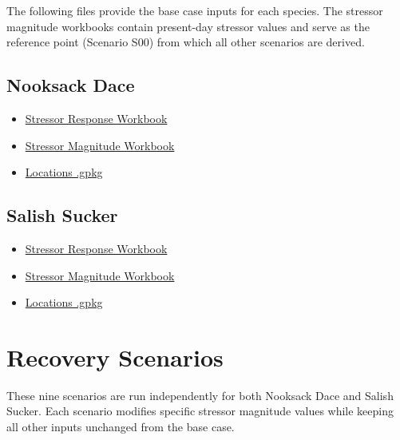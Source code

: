 \documentclass[
  letterpaper,
  DIV=11,
  numbers=noendperiod]{scrreprt}
\providecommand{\tightlist}{%
  \setlength{\itemsep}{0pt}\setlength{\parskip}{0pt}}
\begin{document}
The following files provide the base case inputs for each species. The
stressor magnitude workbooks contain present-day stressor values and
serve as the reference point (Scenario S00) from which all other
scenarios are derived.

\subsection*{Nooksack Dace}\label{nooksack-dace}

\begin{itemize}
\tightlist
\item
  \href{./sample_data/ndss_nooksack_dace/Stressor\%20Response\%20-\%20Nooksack\%20Dace.xlsx}{Stressor
  Response Workbook}
\item
  \href{./sample_data/ndss_nooksack_dace/Stressor\%20Magnitude\%20_\%20Nooksack\%20Dace.xlsx}{Stressor
  Magnitude Workbook}
\item
  \href{./sample_data/ndss_nooksack_dace/Locations_Nooksack_Dace.gpkg}{Locations
  .gpkg}
\end{itemize}

\subsection*{Salish Sucker}\label{salish-sucker}

\begin{itemize}
\tightlist
\item
  \href{./sample_data/ndss_salish_sucker/Stressor\%20Response\%20-\%20Salish\%20Sucker.xlsx}{Stressor
  Response Workbook}
\item
  \href{./sample_data/ndss_salish_sucker/Stressor\%20Magnitude\%20-\%20Salish\%20Sucker.xlsx}{Stressor
  Magnitude Workbook}
\item
  \href{./sample_data/ndss_salish_sucker/Locations_Salish_Sucker.gpkg}{Locations
  .gpkg}
\end{itemize}

\section*{Recovery Scenarios}\label{recovery-scenarios}


These nine scenarios are run independently for both Nooksack Dace and
Salish Sucker. Each scenario modifies specific stressor magnitude values
while keeping all other inputs unchanged from the base case.
\end{document}
